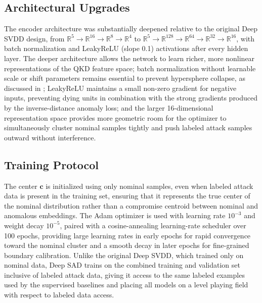 \documentclass[12pt, a4paper]{report}
\begin{document}
\subsection{Architectural Upgrades}
The encoder architecture was substantially deepened relative to the original Deep SVDD design, from $\mathbb{R}^5 \to \mathbb{R}^{16} \to \mathbb{R}^8 \to \mathbb{R}^4$ to $\mathbb{R}^5 \to \mathbb{R}^{128} \to \mathbb{R}^{64} \to \mathbb{R}^{32} \to \mathbb{R}^{16}$, with batch normalization and LeakyReLU (slope 0.1) activations after every hidden layer. The deeper architecture allows the network to learn richer, more nonlinear representations of the QKD feature space; batch normalization without learnable scale or shift parameters remains essential to prevent hypersphere collapse, as discussed in ; LeakyReLU maintains a small non-zero gradient for negative inputs, preventing dying units in combination with the strong gradients produced by the inverse-distance anomaly loss; and the larger 16-dimensional representation space provides more geometric room for the optimizer to simultaneously cluster nominal samples tightly and push labeled attack samples outward without interference.

\subsection{Training Protocol}
The center $\mathbf{c}$ is initialized using only nominal samples, even when labeled attack data is present in the training set, ensuring that it represents the true center of the nominal distribution rather than a compromise centroid between nominal and anomalous embeddings. The Adam optimizer is used with learning rate $10^{-3}$ and weight decay $10^{-5}$, paired with a cosine-annealing learning-rate scheduler over 100 epochs, providing large learning rates in early epochs for rapid convergence toward the nominal cluster and a smooth decay in later epochs for fine-grained boundary calibration. Unlike the original Deep SVDD, which trained only on nominal data, Deep SAD trains on the combined training and validation set inclusive of labeled attack data, giving it access to the same labeled examples used by the supervised baselines and placing all models on a level playing field with respect to labeled data access.

\end{document}
